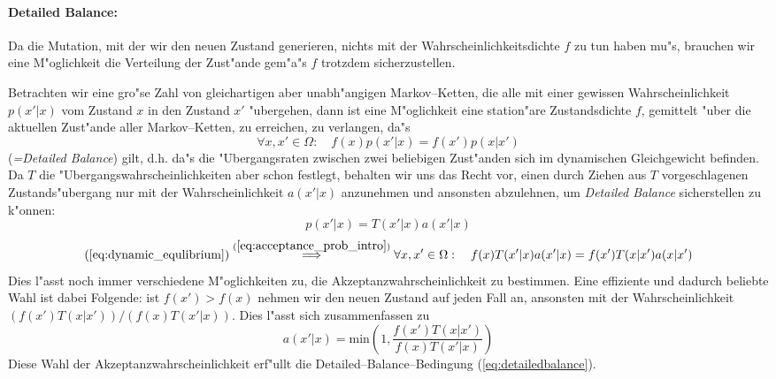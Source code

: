 		
	\paragraph{Detailed Balance:}
	Da die Mutation, mit der wir den neuen Zustand generieren, nichts mit der Wahrscheinlichkeitsdichte $f$ zu tun haben mu"s, brauchen wir eine M"oglichkeit die Verteilung der Zust"ande gem"a"s $f$ trotzdem sicherzustellen.
	
	Betrachten wir eine gro"se Zahl von gleichartigen aber unabh"angigen Markov--Ketten, die alle mit einer gewissen Wahrscheinlichkeit $p(x'|x)$ vom Zustand $x$ in den Zustand $x'$ "ubergehen, dann ist eine M"oglichkeit eine station"are Zustandsdichte $f$, gemittelt "uber die aktuellen Zust"ande aller Markov--Ketten, zu erreichen, zu verlangen, da"s
	\begin{equation}
		\forall x,x' \in \Omega :\quad f(x)p(x'|x) = f(x')p(x|x')
		\label{eq:dynamic_equlibrium}
	\end{equation}
	({\em =Detailed Balance}) gilt, d.h. da"s die "Ubergangsraten zwischen zwei beliebigen Zust"anden sich im dynamischen Gleichgewicht befinden.
	Da $T$ die "Ubergangswahrscheinlichkeiten aber schon festlegt, behalten wir uns das Recht vor, einen durch Ziehen aus $T$ vorgeschlagenen Zustands"ubergang nur mit der Wahrscheinlichkeit $a(x'|x)$ anzunehmen und ansonsten abzulehnen,	um {\em Detailed Balance} sicherstellen zu k"onnen:
	\begin{equation}
		p(x'|x) = T(x'|x)a(x'|x)
		\label{eq:acceptance_prob_intro}
	\end{equation}
	\begin{equation}
		(\ref{eq:dynamic_equlibrium}) \stackrel{(\ref{eq:acceptance_prob_intro})}{\Longrightarrow}
		\forall x,x' \in \Omega :\quad f(x)T(x'|x)a(x'|x) = f(x')T(x|x')a(x|x')
		\label{eq:detailedbalance}
	\end{equation}
	Dies l"asst noch immer verschiedene M"oglichkeiten zu, die Akzeptanzwahrscheinlichkeit zu bestimmen. Eine effiziente und dadurch beliebte Wahl ist dabei Folgende: ist $f(x')>f(x)$ nehmen wir den neuen Zustand auf jeden Fall an, ansonsten mit der Wahrscheinlichkeit $(f(x')T(x|x'))/(f(x)T(x'|x))$. Dies l"asst sich zusammenfassen zu
	\begin{equation}
		a(x'|x)=\text{min}\left(1,\frac{f(x')T(x|x')}{f(x)T(x'|x)}\right)
		\label{eq:acceptanceratio}
	\end{equation}
	Diese Wahl der Akzeptanzwahrscheinlichkeit erf"ullt die Detailed--Balance--Bedingung (\ref{eq:detailedbalance}).
	
